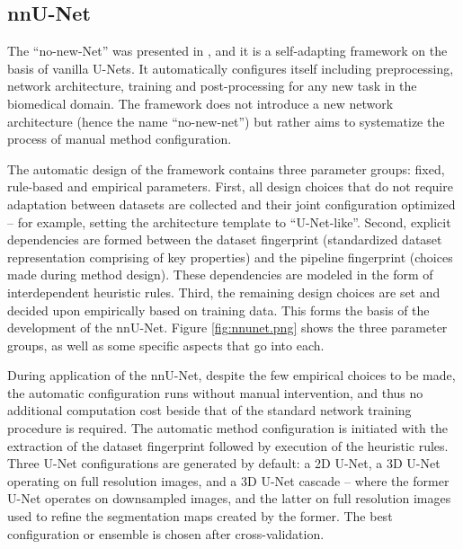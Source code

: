 \subsection{nnU-Net}
The ``no-new-Net'' was presented in \citeyear{nnUnet}, and it is a self-adapting framework on the basis of vanilla U-Nets. It automatically configures itself including preprocessing, network architecture, training and post-processing for any new task in the biomedical domain. The framework does not introduce a new network architecture (hence the name ``no-new-net'') but rather aims to systematize the process of manual method configuration.

The automatic design of the framework contains three parameter groups: fixed, rule-based and empirical parameters. First, all design choices that do not require adaptation between datasets are collected and their joint configuration optimized -- for example, setting the architecture template to ``U-Net-like''. Second, explicit dependencies are formed between the dataset fingerprint (standardized dataset representation comprising of key properties) and the pipeline fingerprint (choices made during method design). These dependencies are modeled in the form of interdependent heuristic rules. Third, the remaining design choices are set and decided upon empirically based on training data. This forms the basis of the development of the nnU-Net. Figure \ref{fig:nnunet.png} shows the three parameter groups, as well as some specific aspects that go into each.


During application of the nnU-Net, despite the few empirical choices to be made, the automatic configuration runs without manual intervention, and thus no additional computation cost beside that of the standard network training procedure is required. The automatic method configuration is initiated with the extraction of the dataset fingerprint followed by execution of the heuristic rules. Three U-Net configurations are generated by default: a 2D U-Net, a 3D U-Net operating on full resolution images, and a 3D U-Net cascade -- where the former U-Net operates on downsampled images, and the latter on full resolution images used to refine the segmentation maps created by the former. The best configuration or ensemble is chosen after cross-validation. 


